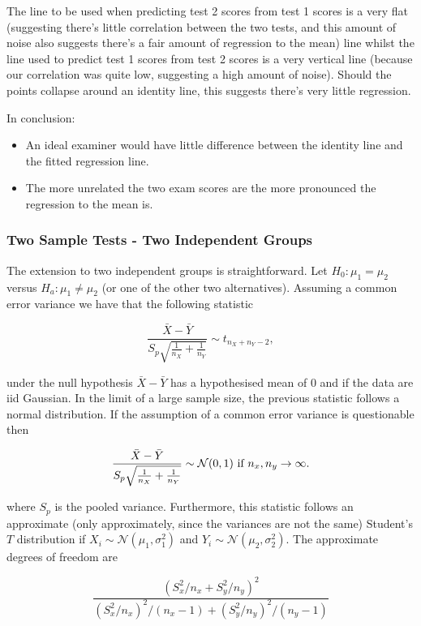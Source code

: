 \documentclass{homework}
\begin{document}
The line to be used when predicting test 2 scores from test 1 scores is a very flat (suggesting there's little correlation between the two tests, and this amount of noise also suggests there's a fair amount of regression to the mean) line whilst the line used to predict test 1 scores from test 2 scores is a very vertical line (because our correlation was quite low, suggesting a high amount of noise). Should the points collapse around an identity line, this suggests there's very little regression. 

In conclusion:

\begin{itemize}
    \item An ideal examiner would have little difference between the identity line and the fitted regression line.
    \item The more unrelated the two exam scores are the more pronounced the regression to the mean is.
\end{itemize} 

\clearpage

\subsubsection{Two Sample Tests - Two Independent Groups}

The extension to two independent groups is straightforward. Let $H_0 : \mu_1 = \mu_2$ versus $H_a: \mu_1 \neq \mu_2$ (or one of the other two alternatives). Assuming a common error variance we have that the following statistic

$$
\frac{\bar{X}-\bar{Y}}{S_p \sqrt{\frac{1}{n_X}+\frac{1}{n_Y}}} \sim t_{n_X+n_Y-2},
$$

under the null hypothesis $\bar{X}-\bar{Y}$ has a hypothesised mean of $0$ and if the data are iid Gaussian. In the limit of a large sample size, the previous statistic follows a normal distribution. If the assumption of a common error variance is questionable then 

$$
\frac{\bar{X}-\bar{Y}}{S_p \sqrt{\frac{1}{n_X}+\frac{1}{n_Y}}} \sim \mathcal{N}(0,1) \textnormal{ if } n_x, n_y \rightarrow \infty.
$$

where $S_p$ is the pooled variance. Furthermore, this statistic follows an approximate (only approximately, since the variances are not the same) Student's $T$ distribution if $X_i \sim \mathcal{N}(\mu_1,\sigma^2_1)$ and $Y_i \sim \mathcal{N}(\mu_2,\sigma^2_2)$. The approximate degrees of freedom are 

$$
\frac{(S_x^2/n_x+S_y^2/n_y)^2}{(S_x^2/n_x)^2/(n_x-1)+(S_y^2/n_y)^2/(n_y-1)}
$$
\end{document}
